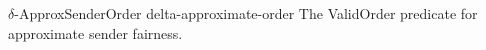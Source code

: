 \begin{cccAlgorithm}
    {$\delta$-\textsf{ApproxSenderOrder}}
    {delta-approximate-order}
    {The \textsf{ValidOrder} predicate for approximate sender fairness.}

    \begin{algorithmic}[1]



        \For{$\tx \in \vec{\tx}$}
        \EndFor
        \State{\Return \true}
    \end{algorithmic}
\end{cccAlgorithm}